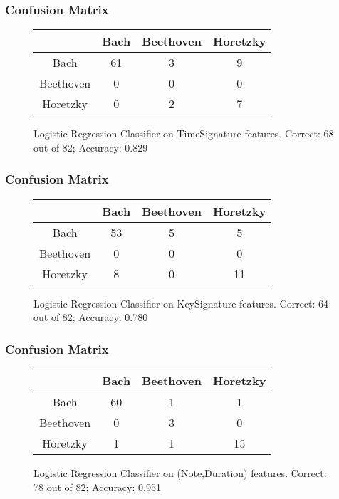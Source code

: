 \documentclass{beamer}
\begin{document}
\begin{frame}
  \frametitle{Confusion Matrix}
  \begin{figure}[!t]
    \begin{center}
      \begin{tabular}{c | c c c}
        & Bach  & Beethoven & Horetzky \\
        \hline
        Bach & 61 & 3 & 9 \\
        Beethoven & 0  & 0 & 0 \\
        Horetzky & 0  & 2 & 7
      \end{tabular}
    \end{center}
    \caption{
      Logistic Regression Classifier on TimeSignature features.
      Correct: 68 out of 82;
      Accuracy: 0.829
    }
  \end{figure}
\end{frame}

\begin{frame}
  \frametitle{Confusion Matrix}
  \begin{figure}[!t]
    \begin{center}
      \begin{tabular}{c | c c c}
        & Bach  & Beethoven & Horetzky \\
        \hline
        Bach & 53 & 5 & 5 \\
        Beethoven & 0  & 0 & 0 \\
        Horetzky & 8  & 0 & 11
      \end{tabular}
    \end{center}
    \caption{
      Logistic Regression Classifier on KeySignature features.
      Correct: 64 out of 82;
      Accuracy: 0.780
    }
  \end{figure}
\end{frame}

\begin{frame}
  \frametitle{Confusion Matrix}
  \begin{figure}[!t]
    \begin{center}
      \begin{tabular}{c | c c c}
        & Bach  & Beethoven & Horetzky \\
        \hline
        Bach & 60 & 1 & 1 \\
        Beethoven & 0  & 3 & 0 \\
        Horetzky & 1  & 1 & 15
      \end{tabular}
    \end{center}
    \caption{
      Logistic Regression Classifier on (Note,Duration) features.
      Correct: 78 out of 82;
      Accuracy: 0.951
    }
  \end{figure}
\end{frame}
\end{document}
